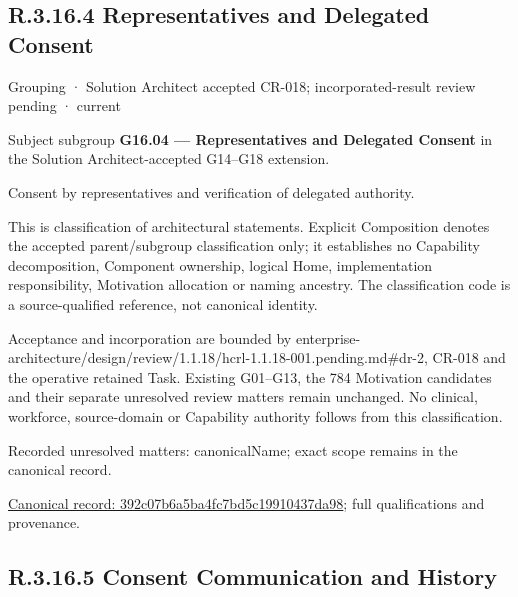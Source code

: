\subsection*{R.3.16.4 Representatives and Delegated Consent}
\label{navigation:R.3.16.4}

\label{element:392c07b6a5ba4fc7bd5c19910437da98}
{\small Grouping · Solution Architect accepted CR-018; incorporated-result review pending · current}\par

Subject subgroup \textbf{G16.04 — Representatives and Delegated Consent} in the Solution Architect-accepted G14–G18 extension.



Consent by representatives and verification of delegated authority.



This is classification of architectural statements. Explicit Composition denotes the accepted parent/subgroup classification only; it establishes no Capability decomposition, Component ownership, logical Home, implementation responsibility, Motivation allocation or naming ancestry. The classification code is a source-qualified reference, not canonical identity.



Acceptance and incorporation are bounded by enterprise-architecture/design/review/1.1.18/hcrl-1.1.18-001.pending.md\#dr-2, CR-018 and the operative retained Task. Existing G01–G13, the 784 Motivation candidates and their separate unresolved review matters remain unchanged. No clinical, workforce, source-domain or Capability authority follows from this classification.


{\small Recorded unresolved matters: canonicalName; exact scope remains in the canonical record.}\par
{\footnotesize \href{../../../../continuum/grouping/392c07b6a5ba4fc7bd5c19910437da98.md}{Canonical record: 392c07b6a5ba4fc7bd5c19910437da98}; full qualifications and provenance.}\par
\subsection*{R.3.16.5 Consent Communication and History}
\label{navigation:R.3.16.5}

